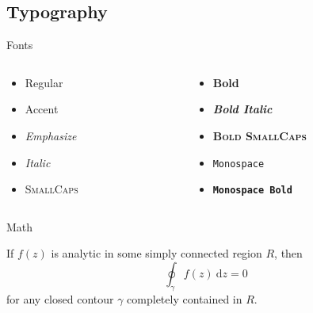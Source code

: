 \documentclass{beamer}%
\begin{document}
\subsection{Typography}
\begin{frame}[c]{Fonts}
\begin{columns}[c]
\begin{column}{.5\textwidth}
\begin{itemize}
	\item Regular
	\item \alert{Accent}
	\item \emph{Emphasize}
	\item \textit{Italic}
	\item \textsc{SmallCaps}
\end{itemize}
\end{column}

\begin{column}{.5\textwidth}
\begin{itemize}
	\item \textbf{Bold}
	\item \textbf{\textit{Bold Italic}}
	\item \textbf{\textsc{Bold SmallCaps}}
	\item \texttt{Monospace}
	\item \texttt{\textbf{Monospace Bold}}
\end{itemize}
\end{column}
\end{columns}
\end{frame}
\begin{frame}{Math}

\begin{theorem}
If $f(z)$ is analytic in some simply connected region $R$, then
\[\oint_{\gamma} f(z)\ \text{d}z = 0\]
for any closed contour $\gamma$ completely contained in $R$.
\end{theorem}
\end{frame}



\end{document}

